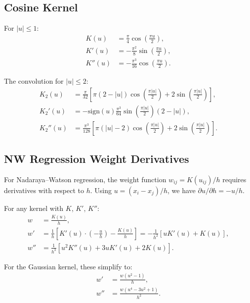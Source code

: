 \documentclass[11pt]{article}
\theoremstyle{definition}
\theoremstyle{remark}
\begin{document}
\subsection{Cosine Kernel}

For $|u| \leq 1$:
\begin{align}
K(u) &= \frac{\pi}{4} \cos\left(\frac{\pi u}{2}\right), \\
K'(u) &= -\frac{\pi^2}{8} \sin\left(\frac{\pi u}{2}\right), \\
K''(u) &= -\frac{\pi^3}{16} \cos\left(\frac{\pi u}{2}\right).
\end{align}

The convolution for $|u| \leq 2$:
\begin{align}
K_2(u) &= \frac{\pi}{32} \left[ \pi(2 - |u|) \cos\left(\frac{\pi |u|}{2}\right) + 2\sin\left(\frac{\pi |u|}{2}\right) \right], \\
K_2'(u) &= -\mathrm{sign}(u) \frac{\pi^3}{64} \sin\left(\frac{\pi |u|}{2}\right) (2 - |u|), \\
K_2''(u) &= \frac{\pi^3}{128} \left[ \pi(|u| - 2) \cos\left(\frac{\pi |u|}{2}\right) + 2\sin\left(\frac{\pi |u|}{2}\right) \right].
\end{align}

\subsection{NW Regression Weight Derivatives}

For Nadaraya--Watson regression, the weight function $w_{ij} = K(u_{ij})/h$ requires derivatives with respect to $h$.
Using $u = (x_i - x_j)/h$, we have $\partial u / \partial h = -u/h$.

For any kernel with $K$, $K'$, $K''$:
\begin{align}
w &= \frac{K(u)}{h}, \\
w' &= \frac{1}{h} \left[ K'(u) \cdot \left(-\frac{u}{h}\right) - \frac{K(u)}{h} \right] = -\frac{1}{h^2} \left[ u K'(u) + K(u) \right], \\
w'' &= \frac{1}{h^3} \left[ u^2 K''(u) + 3u K'(u) + 2K(u) \right].
\end{align}

For the Gaussian kernel, these simplify to:
\begin{align}
w' &= \frac{w(u^2 - 1)}{h}, \\
w'' &= \frac{w(u^4 - 3u^2 + 1)}{h^2}.
\end{align}
\end{document}
